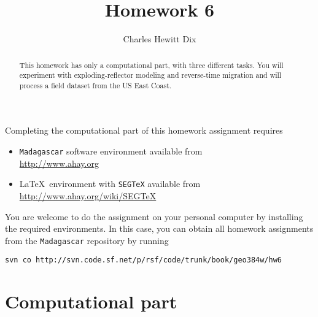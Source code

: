 \author{Charles Hewitt Dix} 
\title{Homework 6}

\begin{abstract}
  This homework has only a computational part, with three different
  tasks. You will experiment with exploding-reflector modeling and
  reverse-time migration and will process a field dataset from the US
  East Coast.
\end{abstract}

Completing the computational part of this homework assignment requires
\begin{itemize}
\item \texttt{Madagascar} software environment available from \\
  \url{http://www.ahay.org}
\item \LaTeX\ environment with \texttt{SEGTeX} available from \\ 
  \url{http://www.ahay.org/wiki/SEGTeX}
\end{itemize}

You are welcome to do the assignment on your personal computer by
installing the required environments. In this case, you can obtain all
homework assignments from the \texttt{Madagascar} repository by running
\begin{verbatim}
svn co http://svn.code.sf.net/p/rsf/code/trunk/book/geo384w/hw6
\end{verbatim}

\section{Computational part}


